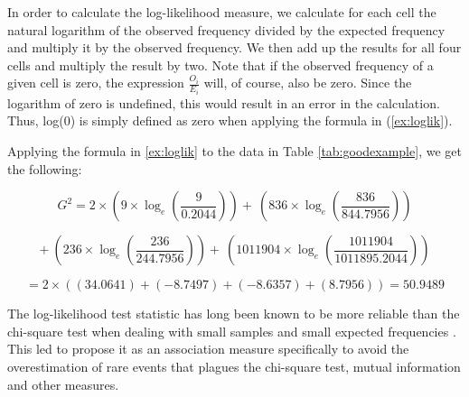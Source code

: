 In order to calculate the log-likelihood measure, we calculate for each cell the natural logarithm of the observed frequency divided by the expected frequency and multiply it by the observed frequency. We then add up the results for all four cells and multiply the result by two. Note that if the observed frequency of a given cell is zero, the expression $\frac{O_i}{E_i}$ will, of course, also be zero. Since the logarithm of zero is undefined, this would result in an error in the calculation. Thus, log(0) is simply defined as zero when applying the formula in (\ref{ex:loglik}).

%
%
%
%

Applying the formula in \ref{ex:loglik} to the data in Table \ref{tab:goodexample}, we get the following:

$$G^2 = 2 \times \left( 9 \times \log_e \left( \frac{9}{0.2044} \right) \right) +\ \left( 836 \times \log_e \left( \frac{836}{844.7956} \right) \right)$$

$$+\ \left( 236 \times \log_e \left( \frac{236}{244.7956} \right) \right) +\ \left( 1011904 \times \log_e \left( \frac{1011904}{1011895.2044} \right) \right)$$

$$= 2 \times \left( \left( 34.0641 \right) + \left( -8.7497 \right) + \left( -8.6357 \right) + \left( 8.7956 \right) \right) = 50.9489$$

The log-likelihood test statistic has long been known to be more reliable than the chi-square test when dealing with small samples and small expected frequencies \citep[134ff]{read_goodness--fit_1988}. This led \citet{dunning_accurate_1993} to propose it as an association measure specifically to avoid the overestimation of rare events that plagues the chi-square test, mutual information and other measures.

